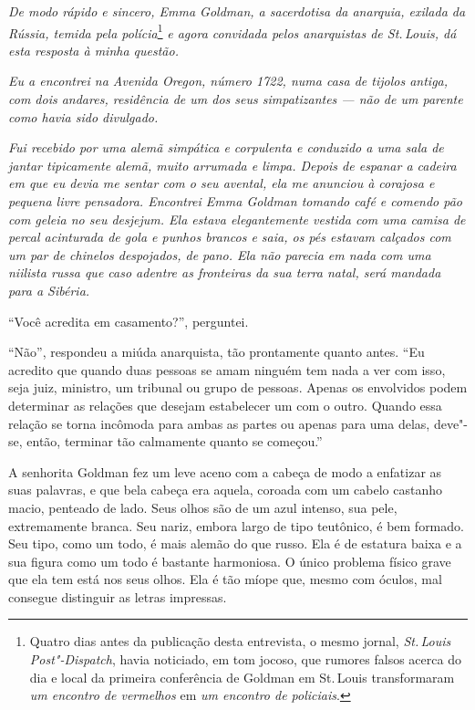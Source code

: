 \setlength{\epigraphwidth}{.65\textwidth}
\begin{epigraphs} 
\end{epigraphs} 

\noindent{}\textit{De modo rápido e sincero, Emma Goldman, a sacerdotisa da anarquia,
exilada da Rússia, temida pela polícia}\footnote{Quatro dias antes da publicação desta entrevista, o mesmo jornal, \textit{St.\,Louis Post"-Dispatch}, havia noticiado, em tom jocoso, que rumores falsos acerca do dia e local da primeira conferência de Goldman em St.\,Louis transformaram \textit{um encontro de vermelhos} em \textit{um encontro de policiais}.} \textit{e agora convidada
pelos anarquistas de St.\,Louis, dá esta resposta à minha questão.}

\textit{Eu a encontrei na Avenida Oregon, número 1722, numa casa
de tijolos antiga, com dois andares, residência de um dos seus
simpatizantes --- não de um parente como havia sido divulgado.}

\textit{Fui recebido por uma alemã simpática e corpulenta e conduzido a uma sala de jantar tipicamente alemã, muito arrumada e limpa. Depois de espanar a
cadeira em que eu devia me sentar com o seu avental, ela me anunciou à
corajosa e pequena livre pensadora. Encontrei Emma Goldman tomando café
e comendo pão com geleia no seu desjejum. Ela estava elegantemente
vestida com uma camisa de percal acinturada de gola e punhos brancos e
saia, os pés estavam calçados com um par de chinelos despojados, de
pano. Ela não parecia em nada com uma niilista russa que caso adentre as
fronteiras da sua terra natal, será mandada para a Sibéria.}

\begin{center}\end{center}

``Você acredita em casamento?'', perguntei.

``Não'', respondeu a miúda anarquista, tão prontamente quanto antes.
``Eu acredito que quando duas pessoas se amam ninguém tem nada a ver com
isso, seja juiz, ministro, um tribunal ou grupo de pessoas.
Apenas os envolvidos podem determinar as relações que desejam estabelecer um com o
outro. Quando essa relação se torna incômoda para ambas as partes ou
apenas para uma delas, deve"-se, então, terminar tão calmamente quanto se
começou.''

A senhorita Goldman fez um leve aceno com a cabeça de modo a enfatizar
as suas palavras, e que bela cabeça era aquela, coroada com um cabelo
castanho macio, penteado de lado. Seus olhos são de um azul intenso,
sua pele, extremamente branca. Seu nariz, embora largo de tipo
teutônico, é bem formado. Seu tipo, como um todo, é mais alemão do que
russo. Ela é de estatura baixa e a sua figura como um todo é bastante harmoniosa.
O único problema físico grave que ela tem está nos seus olhos. Ela é tão míope que,
mesmo com óculos, mal consegue distinguir as letras impressas.

